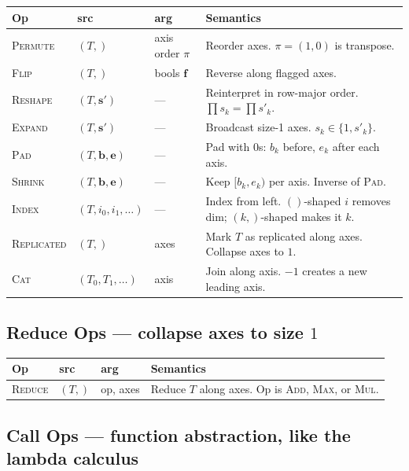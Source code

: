 \documentclass[10pt,letterpaper]{article}
\newcommand{\op}[1]{\textsc{#1}}
\begin{document}
\begin{tabular}{@{}l l l l@{}}
\toprule
\textbf{Op} & \textbf{src} & \textbf{arg} & \textbf{Semantics} \\
\midrule
\op{Permute} & $(T,)$ & axis order $\pi$ & Reorder axes. $\pi = (1,0)$ is transpose. \\
\op{Flip} & $(T,)$ & bools $\mathbf{f}$ & Reverse along flagged axes. \\
\op{Reshape} & $(T, \mathbf{s'})$ & --- & Reinterpret in row-major order. $\prod s_k = \prod s'_k$. \\
\op{Expand} & $(T, \mathbf{s'})$ & --- & Broadcast size-1 axes. $s_k \in \{1, s'_k\}$. \\
\op{Pad} & $(T, \mathbf{b}, \mathbf{e})$ & --- & Pad with $0$s: $b_k$ before, $e_k$ after each axis. \\
\op{Shrink} & $(T, \mathbf{b}, \mathbf{e})$ & --- & Keep $[b_k, e_k)$ per axis. Inverse of \op{Pad}. \\
\op{Index} & $(T, i_0, i_1, \ldots)$ & --- & Index from left. $()$-shaped $i$ removes dim; $(k,)$-shaped makes it $k$. \\
\op{Replicated} & $(T,)$ & axes & Mark $T$ as replicated along axes. Collapse axes to $1$. \\
\op{Cat} & $(T_0, T_1, \ldots)$ & axis & Join along axis. $-1$ creates a new leading axis. \\
\bottomrule
\end{tabular}

\subsection*{{\color{reducered}Reduce Ops} \normalfont\small--- collapse axes to size $1$}

\begin{tabular}{@{}l l l l@{}}
\toprule
\textbf{Op} & \textbf{src} & \textbf{arg} & \textbf{Semantics} \\
\midrule
\op{Reduce} & $(T,)$ & op, axes & Reduce $T$ along axes. Op is \op{Add}, \op{Max}, or \op{Mul}. \\
\bottomrule
\end{tabular}

\subsection*{{\color{callblue}Call Ops} \normalfont\small--- function abstraction, like the lambda calculus}
\end{document}
